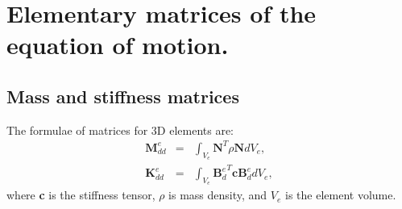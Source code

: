 
\chapter{Elementary matrices of the equation of motion.}
\label{app:matrices}

\section{Mass and stiffness matrices}
The formulae of matrices for 3D elements are:
\begin{eqnarray}
	\textbf{M}_{dd}^e & = & \int_{V_e}\textbf{N}^T\rho \textbf{N} dV_e,\\
	\textbf{K}_{dd}^e & = & \int_{V_e}{\textbf{B}_d^e}^T\textbf{c}\textbf{B}_d^edV_e,
\end{eqnarray}
where \textbf{c} is the stiffness tensor, \(\rho\) is mass density, and \(V_e\) is the element volume.


